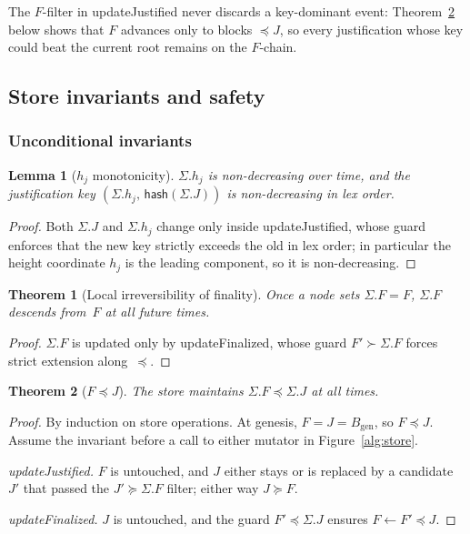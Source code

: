 \ifx\litemode\undefined\documentclass{article}\fi
\newcommand{\genesis}{\ensuremath{B_{\mathrm{gen}}}}
\newcommand{\hash}{\mathsf{hash}}
\newcommand{\updateJustified}{\textsf{updateJustified}\xspace}
\newcommand{\updateFinalized}{\textsf{updateFinalized}\xspace}
\theoremstyle{plain}
\newtheorem{theorem}{Theorem}
\newtheorem{lemma}{Lemma}
\theoremstyle{definition}
\theoremstyle{remark}
\begin{document}
The $F$-filter in \updateJustified never discards a key-dominant event: Theorem~\ref{thm:fleqr} below shows that $F$ advances only to blocks $\preceq J$, so every justification whose key could beat the current root remains on the $F$-chain.

\subsection{Store invariants and safety}

\subsubsection*{Unconditional invariants}

\begin{lemma}[$h_j$ monotonicity]\label{lem:Rs-key-monotone}
$\Sigma.h_j$ is non-decreasing over time, and the justification key $(\Sigma.h_j,\, \hash(\Sigma.J))$ is non-decreasing in lex order.
\end{lemma}

\begin{proof}
Both $\Sigma.J$ and $\Sigma.h_j$ change only inside \updateJustified, whose guard enforces that the new key strictly exceeds the old in lex order; in particular the height coordinate $h_j$ is the leading component, so it is non-decreasing.
\end{proof}

\begin{theorem}[Local irreversibility of finality]\label{thm:finperm}
Once a node sets $\Sigma.F = F$, $\Sigma.F$ descends from~$F$ at all future times.
\end{theorem}

\begin{proof}
$\Sigma.F$ is updated only by \updateFinalized, whose guard $F' \succ \Sigma.F$ forces strict extension along~$\preceq$.
\end{proof}

\begin{theorem}[$F \preceq J$]\label{thm:fleqr}
The store maintains $\Sigma.F \preceq \Sigma.J$ at all times.
\end{theorem}

\begin{proof}
By induction on store operations.
At genesis, $F = J = \genesis$, so $F \preceq J$.
Assume the invariant before a call to either mutator in Figure~\ref{alg:store}.

\emph{\updateJustified.}
$F$ is untouched, and $J$ either stays or is replaced by a candidate~$J'$ that passed the $J' \succeq \Sigma.F$ filter; either way $J \succeq F$.

\emph{\updateFinalized.}
$J$ is untouched, and the guard $F' \preceq \Sigma.J$ ensures $F \gets F' \preceq J$.
\end{proof}
\end{document}
